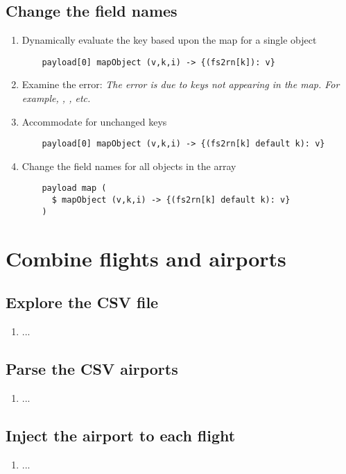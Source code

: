 \subsection{Change the field names}
\begin{enumerate}[resume*]
\item Dynamically evaluate the key based upon the  map for a single object
  \begin{lstlisting}
    payload[0] mapObject (v,k,i) -> {(fs2rn[k]): v}
  \end{lstlisting}
\item Examine the error: 
  \newline
  \emph{
    The error is due to keys not appearing in the  map.  For example, , , etc.
  }
\item Accommodate for unchanged keys
  \begin{lstlisting}
    payload[0] mapObject (v,k,i) -> {(fs2rn[k] default k): v}
  \end{lstlisting}
\item Change the field names for all objects in the array
  \begin{lstlisting}
    payload map (
      $ mapObject (v,k,i) -> {(fs2rn[k] default k): v}
    )
  \end{lstlisting}
\end{enumerate}

\section{Combine flights and airports}

\subsection{Explore the CSV file}
\begin{enumerate}
\item ...
\end{enumerate}

\subsection{Parse the CSV airports}
\begin{enumerate}[resume*]
\item ...
\end{enumerate}

\subsection{Inject the airport to each flight}
\begin{enumerate}[resume*]
\item ...
\end{enumerate}

